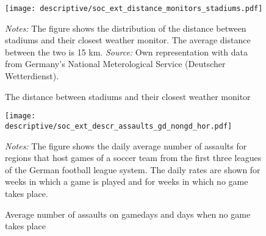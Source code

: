 \documentclass[11pt, a4paper]{article} %
\begin{document}
\vspace*{\fill}
\begin{figure}[H]\centering
	\caption{The distance between stadiums and their closest weather monitor}\label{fig_soc_ext:hist_distance_stadium_monitors}
	\texttt{[image: descriptive/soc\_ext\_distance\_monitors\_stadiums.pdf]}
	\begin{minipage}{0.95\linewidth}
		\scriptsize{\emph{Notes:} The figure shows the distribution of the distance between stadiums and their closest weather monitor. The average distance between the two is 15 km. \newline \emph{Source:} Own representation with data from Germany's National Meterological Service (Deutscher Wetterdienst).}
	\end{minipage}
\end{figure}
\vspace*{\fill}\clearpage


\vspace*{\fill}
\begin{figure}[H]\centering
	\caption{Average number of assaults on gamedays and days when no game takes place}\label{fig_soc_ext:assaults_across_dows}
	\texttt{[image: descriptive/soc\_ext\_descr\_assaults\_gd\_nongd\_hor.pdf]}
	\scriptsize
	\begin{minipage}{\linewidth}
		\emph{Notes:} The figure shows the daily average number of assaults for regions that host games of a soccer team from the first three leagues of the German football league system. The daily rates are shown for weeks in which a game is played and for weeks in which no game takes place.
	\end{minipage}
\end{figure}
\vspace*{\fill}\clearpage


\newpage
\renewcommand\thetable{A\arabic{table}}
\setcounter{table}{0} 
\end{document}
